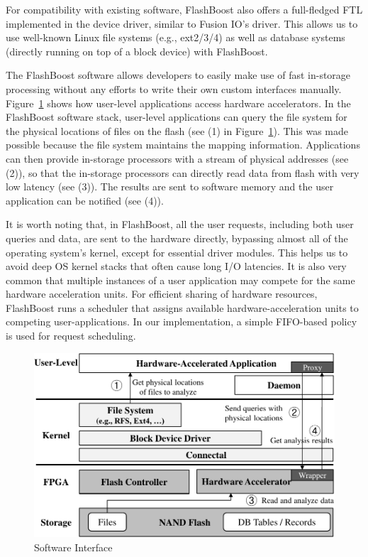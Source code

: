 For compatibility with existing software, FlashBoost also offers a full-fledged
FTL implemented in the device driver, similar to Fusion IO's driver. 
This allows us to use well-known Linux file systems (e.g.,
ext2/3/4) as well as database systems (directly running on top of a block
device) with FlashBoost.

The FlashBoost software allows developers to easily make use of fast in-storage
processing without any efforts to write their own custom interfaces manually.
Figure~\ref{fig:filesystem} shows how user-level applications access hardware
accelerators.  In the FlashBoost software stack, user-level applications can
query the file system for the physical locations of files on the flash (see (1)
in Figure~\ref{fig:filesystem}). This was made possible because the file system
maintains the mapping information.  Applications can then provide in-storage
processors with a stream of physical addresses (see (2)), so that the in-storage processors can directly read
data from flash with very low latency (see (3)).
The results are sent to software memory and the user application can be notified
(see (4)).

It is worth noting that, in FlashBoost, all the user requests, including both
user queries and data, are sent to the hardware directly, bypassing almost all
of the operating system's kernel, except for essential driver modules.  This helps us to avoid deep OS
kernel stacks that often cause long I/O latencies.  It is also very common that
multiple instances of a user application may compete for the same hardware
acceleration units. For efficient sharing of hardware resources, FlashBoost runs
a scheduler that assigns available hardware-acceleration units to competing
user-applications. In our implementation, a simple FIFO-based policy is used for
request scheduling.

\begin{figure}[h]
	\begin{center}
	\includegraphics[width=0.4\paperwidth]{figures/software.pdf}
	\caption{Software Interface}
	\label{fig:filesystem}
	\end{center}
\end{figure}
